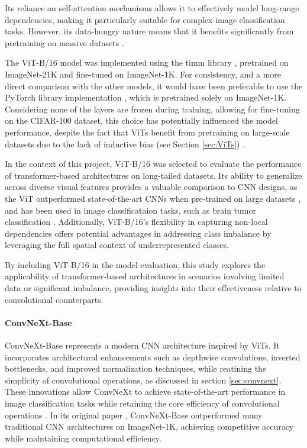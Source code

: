 Its reliance on self-attention mechanisms allows it to effectively model long-range dependencies, making it particularly suitable for complex image classification tasks. However, its data-hungry nature means that it benefits significantly from pretraining on massive datasets \cite{dosovitskiy2021imageworth16x16words}.

The ViT-B/16 model was implemented using the timm library \cite{huggingface2024vitbase}, pretrained on ImageNet-21K and fine-tuned on ImageNet-1K. For consistency, and a more direct comparison with the other models, it would have been preferable to use the PyTorch library implementation \cite{torchvision2024vitb16}, which is pretrained solely on ImageNet-1K. Considering none of the layers are frozen during training, allowing for fine-tuning on the CIFAR-100 dataset, this choice has potentially influenced the model performance, despite the fact that ViTs benefit from pretraining on large-scale datasets due to the lack of inductive bias (see Section \ref{sec:ViTs}) \cite{dosovitskiy2021imageworth16x16words,kolesnikov2020bigtransferbitgeneral} .

In the context of this project, ViT-B/16 was selected to evaluate the performance of transformer-based architectures on long-tailed datasets. Its ability to generalize across diverse visual features provides a valuable comparison to CNN designs, as the ViT outperformed state-of-the-art CNNs when pre-trained on large datasets \cite{dosovitskiy2021imageworth16x16words}, and has been used in image classificataion tasks, such as brain tumor classification \cite{asiri2023advancing}. Additionally, ViT-B/16's flexibility in capturing non-local dependencies offers potential advantages in addressing class imbalance by leveraging the full spatial context of underrepresented classes.

By including ViT-B/16 in the model evaluation, this study explores the applicability of transformer-based architectures in scenarios involving limited data or significant imbalance, providing insights into their effectiveness relative to convolutional counterparts.



\paragraph{ConvNeXt-Base}
ConvNeXt-Base \cite{liu2022convnet2020s} represents a modern CNN architecture inspired by ViTs. It incorporates architectural enhancements such as depthwise convolutions, inverted bottlenecks, and improved normalization techniques, while reatining the simplicity of convolutional operations, as discussed in section \ref{sec:convnext}. These innovations allow ConvNeXt to achieve state-of-the-art performance in image classification tasks while retaining the core efficiency of convolutional operations \cite{liu2022convnet2020s}. In its original paper \cite{liu2022convnet2020s}, ConvNeXt-Base outperformed many traditional CNN architectures on ImageNet-1K, achieving competitive accuracy while maintaining computational efficiency. 

